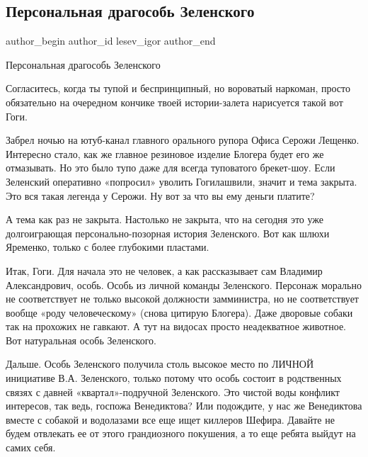  
 
 
 
 
 
\subsection{Персональная драгособь Зеленского}
\label{sec:14_12_2021.fb.lesev_igor.1.dragosobj_zelenskogo}
 
\ifcmt
 author_begin
   author_id lesev_igor
 author_end
\fi

Персональная драгособь Зеленского

Согласитесь, когда ты тупой и беспринципный, но вороватый наркоман, просто
обязательно на очередном кончике твоей истории-залета нарисуется такой вот
Гоги.


Забрел ночью на ютуб-канал главного орального рупора Офиса Серожи Лещенко.
Интересно стало, как же главное резиновое изделие Блогера будет его же
отмазывать. Но это было тупо даже для всегда туповатого брекет-шоу. Если
Зеленский оперативно «попросил» уволить Гогилашвили, значит и тема закрыта. Это
вся такая легенда у Серожи. Ну вот за что вы ему деньги платите?

А тема как раз не закрыта. Настолько не закрыта, что на сегодня это уже
долгоиграющая персонально-позорная история Зеленского. Вот как шлюхи Яременко,
только с более глубокими пластами.

Итак, Гоги. Для начала это не человек, а как рассказывает сам Владимир
Александрович, особь. Особь из личной команды Зеленского. Персонаж морально не
соответствует не только высокой должности замминистра, но не соответствует
вообще «роду человеческому» (снова цитирую Блогера). Даже дворовые собаки так
на прохожих не гавкают. А тут на видосах просто неадекватное животное. Вот
натуральная особь Зеленского.

Дальше. Особь Зеленского получила столь высокое место по ЛИЧНОЙ инициативе В.А.
Зеленского, только потому что особь состоит в родственных связях с давней
«квартал»-подручной Зеленского. Это чистой воды конфликт интересов, так ведь,
госпожа Венедиктова? Или подождите, у нас же Венедиктова вместе с собакой и
водолазами все еще ищет киллеров Шефира. Давайте не будем отвлекать ее от этого
грандиозного покушения, а то еще ребята выйдут на самих себя.

